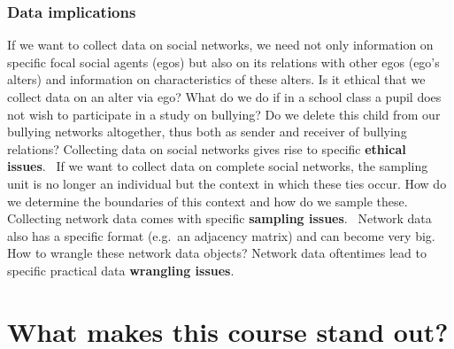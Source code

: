 \documentclass[
]{book}
\begin{document}
\hypertarget{data-implications}{%
\subsubsection{Data implications}\label{data-implications}}

If we want to collect data on social networks, we need not only information on specific focal social agents (egos) but also on its relations with other egos (ego's alters) and information on characteristics of these alters. Is it ethical that we collect data on an alter via ego? What do we do if in a school class a pupil does not wish to participate in a study on bullying? Do we delete this child from our bullying networks altogether, thus both as sender and receiver of bullying relations? Collecting data on social networks gives rise to specific \textbf{ethical issues}.~
If we want to collect data on complete social networks, the sampling unit is no longer an individual but the context in which these ties occur. How do we determine the boundaries of this context and how do we sample these. Collecting network data comes with specific \textbf{sampling issues}.~
Network data also has a specific format (e.g.~an adjacency matrix) and can become very big. How to wrangle these network data objects? Network data oftentimes lead to specific practical data \textbf{wrangling issues}.\\

\hypertarget{what-makes-this-course-stand-out}{%
\section{What makes this course stand out?}\label{what-makes-this-course-stand-out}}
\end{document}
